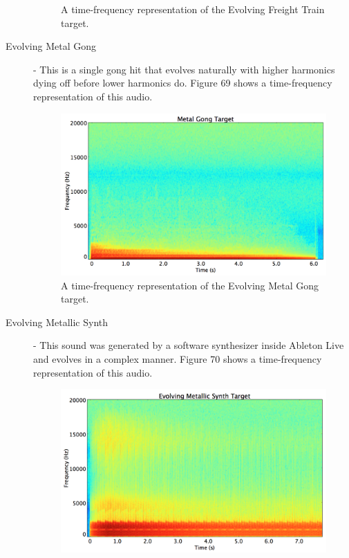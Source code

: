 \documentclass[12pt]{report} 	%
\numberwithin{figure}{chapter}
\numberwithin{table}{chapter}
\numberwithin{equation}{chapter}
\begin{document}
\begin{flushleft}
\begin{description}
\begin{figure}[h!]
\begin{center}
\caption[Evolving freight train time-frequency representation]{A time-frequency representation of the Evolving Freight Train target.}
\end{center}
\end{figure}
\item[Evolving Metal Gong] - This is a single gong hit that evolves naturally with higher harmonics dying off before lower harmonics do. Figure 69 shows a time-frequency representation of this audio.
\begin{figure}[h!]
\begin{center}
\includegraphics[scale=0.35,width=\linewidth]{MetalGongTargetSTFT}
\caption[Evolving metal gong time-frequency representation]{A time-frequency representation of the Evolving Metal Gong target.}
\end{center}
\end{figure}
\item[Evolving Metallic Synth] - This sound was generated by a software synthesizer inside Ableton Live and evolves in a complex manner. Figure 70 shows a time-frequency representation of this audio.
\begin{figure}[h!]
\begin{center}
\includegraphics[scale=0.35,width=\linewidth]{EvolvingMetallicSynthTargetSTFT}

\end{center}
\end{figure}
\end{description}
\end{flushleft}
\end{document}
